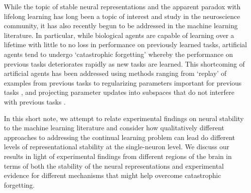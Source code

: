 While the topic of stable neural representations and the apparent paradox with lifelong learning has long been a topic of interest and study in the neuroscience community, it has also recently begun to be addressed in the machine learning literature.
In particular, while biological agents are capable of learning over a lifetime with little to no loss in performance on previously learned tasks, artificial agents tend to undergo `catastrophic forgetting' whereby the performance on previous tasks deteriorates rapidly as new tasks are learned.
This shortcoming of artificial agents has been addressed using methods ranging from `replay' of examples from previous tasks \citep{van2018generative,pan2020continual,li2017learning,shin2017continual} to regularizing parameters important for previous tasks \citep{kirkpatrick2017overcoming,ritter2018online,nguyen2017variational}, and projecting parameter updates into subspaces that do not interfere with previous tasks \citep{zeng2019continual,duncker2020organizing}.

In this short note, we attempt to relate experimental findings on neural stability to the machine learning literature and consider how qualitatively different approaches to addressing the continual learning problem can lead do different levels of representational stability at the single-neuron level.
We discuss our results in light of experimental findings from different regions of the brain in terms of both the stability of the neural representations and experimental evidence for different mechanisms that might help overcome catastrophic forgetting.

